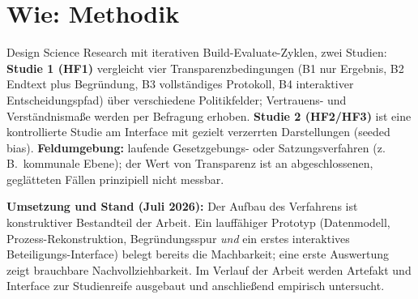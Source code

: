 \documentclass[11pt,a4paper]{scrartcl}
\begin{document}
\section{Wie: Methodik}

Design Science Research mit iterativen Build-Evaluate-Zyklen, zwei Studien:
\textbf{Studie 1 (HF1)} vergleicht vier Transparenzbedingungen (B1 nur Ergebnis, B2 Endtext plus
Begründung, B3 vollständiges Protokoll, B4 interaktiver Entscheidungspfad) über verschiedene
Politikfelder; Vertrauens- und Verständnismaße werden per Befragung erhoben. \textbf{Studie 2
(HF2/HF3)} ist eine kontrollierte Studie am Interface mit gezielt verzerrten Darstellungen
(seeded bias). \textbf{Feldumgebung:} laufende Gesetzgebungs- oder Satzungsverfahren (z.\,B.\
kommunale Ebene); der Wert von Transparenz ist an abgeschlossenen, geglätteten Fällen prinzipiell
nicht messbar.

\textbf{Umsetzung und Stand (Juli 2026):} Der Aufbau des Verfahrens ist konstruktiver Bestandteil
der Arbeit. Ein lauffähiger Prototyp (Datenmodell, Prozess-Rekonstruktion, Begründungsspur
\emph{und} ein erstes interaktives Beteiligungs-Interface) belegt bereits die Machbarkeit; eine
erste Auswertung zeigt brauchbare Nachvollziehbarkeit. Im Verlauf der Arbeit werden Artefakt und
Interface zur Studienreife ausgebaut und anschließend empirisch untersucht.
\end{document}

